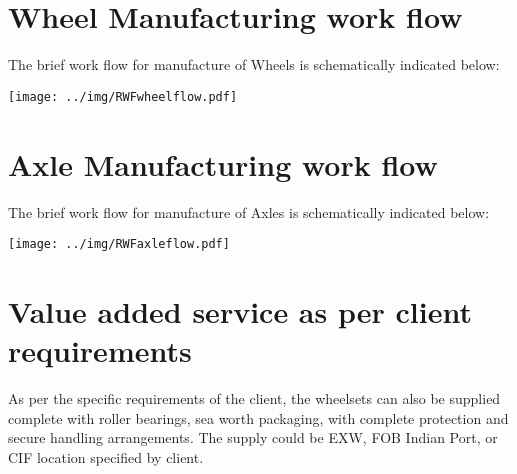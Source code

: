 
\section{Wheel Manufacturing work flow}

% 

The brief work flow for manufacture of Wheels is schematically indicated below:

\begin{center}
\texttt{[image: ../img/RWFwheelflow.pdf]}
\end{center}



\section{Axle Manufacturing work flow}

The brief work flow for manufacture of Axles is schematically indicated below:

\begin{center}
\texttt{[image: ../img/RWFaxleflow.pdf]}

\end{center}








\section{Value added service as per client requirements}

As per the specific requirements of the client, the wheelsets can also be supplied complete with roller bearings, sea worth packaging, with complete protection and secure handling arrangements.
The supply could be EXW, FOB Indian Port, or CIF location specified by client.
